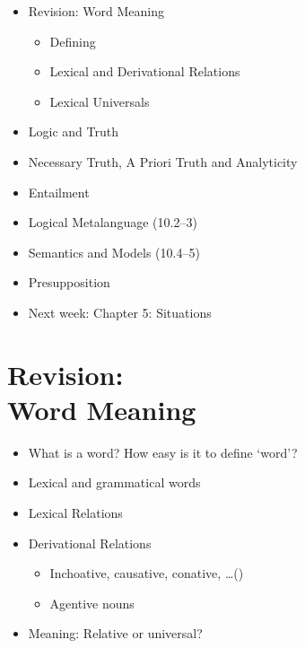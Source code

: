 \documentclass[headrule,footrule]{foils}
\begin{document}
\maketitle

%


\begin{itemize}\addtolength{\itemsep}{-1ex}
\item Revision: Word Meaning
  \begin{itemize}
  \item Defining 
  \item Lexical  and Derivational Relations
  \item Lexical Universals
 \end{itemize}
\item Logic and Truth
\item Necessary Truth, A Priori Truth and Analyticity
\item Entailment
\item Logical Metalanguage (10.2--3)
\item Semantics and Models (10.4--5)
\item Presupposition
\item Next week: Chapter 5: Situations
\end{itemize}


\section{Revision: \\ Word Meaning}

\begin{itemize}
\item What is a word? How easy is it to define ‘word’?
\item Lexical and grammatical words
\item Lexical Relations
\item Derivational Relations
  \begin{itemize}
  \item Inchoative, causative, conative, \ldots ()
  \item Agentive nouns
  \end{itemize}
\item Meaning: Relative or universal?
\end{itemize}
\end{document}
